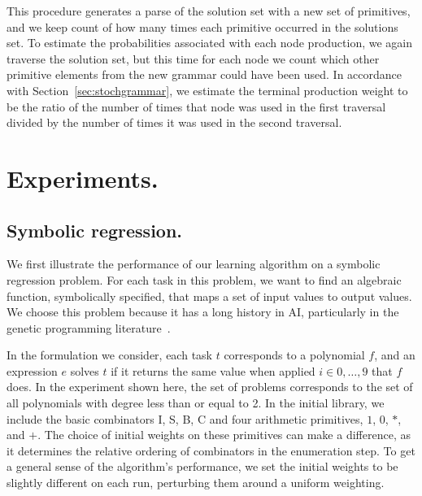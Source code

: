 \documentclass{article}
\begin{document}

This procedure generates a parse of the solution set with a new set of
primitives, and we keep count of how many times each primitive
occurred in the solutions set. To estimate the probabilities
associated with each node production, we again traverse the solution
set, but this time for each node we count which other primitive
elements from the new grammar could have been used. In accordance with
Section~\ref{sec:stochgrammar}, we estimate the terminal production weight
to be the ratio of the number of times that node was used in the first
traversal divided by the number of times it was used in the second
traversal.

\section{Experiments.}
\subsection{Symbolic regression.}
\label{sec:symreg}

We first illustrate the performance of our learning algorithm on a
symbolic regression problem. For each task in this problem, we want to
find an algebraic function, symbolically specified, that maps a set of
input values to output values. We choose this problem because it has a
long history in AI, particularly in the genetic programming
literature~\cite{DBLP:books/daglib/0070933}.

In the formulation we consider, each task $t$ corresponds to a
polynomial $f$, and an expression $e$ solves $t$ if it returns the
same value when applied $i \in 0, \dots, 9$ that $f$ does. In the
experiment shown here, the set of problems corresponds to the set of
all polynomials with degree less than or equal to 2. In the initial
library, we include the basic combinators I, S, B, C and four
arithmetic primitives, $1$, $0$, $*$, and $+$. The choice of initial
weights on these primitives can make a difference, as it determines
the relative ordering of combinators in the enumeration step. To get a
general sense of the algorithm's performance, we set the initial
weights to be slightly different on each run, perturbing them around a
uniform weighting.
\end{document}
